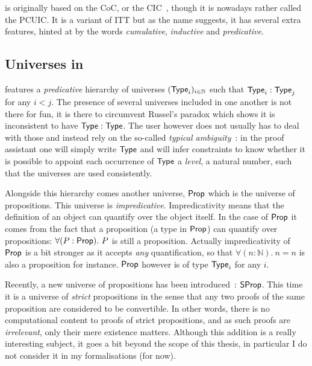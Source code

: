\Coq is originally based on the \acrfull{CoC}, or the
\acrfull{CIC}~, though it is nowadays rather
called the \acrfull{PCUIC}.
It is a variant of \acrshort{ITT} but as the name suggests, it has several
extra features, hinted at by the words \emph{cumulative}, \emph{inductive}
and \emph{predicative}.

\subsection{Universes in \Coq}

\Coq features a \emph{predicative} hierarchy of universes
\((\mathsf{Type}_i)_{i \in \mathbb{N}}\) such that \(\mathsf{Type}_i : \mathsf{Type}_j\) for any
\(i < j\). The presence of several universes included in one another is not
there for fun, it is there to circumvent Russel's paradox which
shows it is inconsistent to have \(\mathsf{Type} : \mathsf{Type}\).
The \Coq user however does not usually has to deal with those and
instead rely on the so-called
\emph{typical ambiguity}~:
in the \Coq proof assistant one will simply write \(\mathsf{Type}\) and \Coq will infer
constraints to know whether it is possible to appoint each occurrence of
\(\mathsf{Type}\) a \emph{level}, \ie a natural number, such that the universes are used
consistently.

Alongside this hierarchy comes another universe, \(\mathsf{Prop}\) which is the universe
of propositions. This universe is \emph{impredicative}.
Impredicativity means that the definition of an object can quantify over the
object itself. In the case of \(\mathsf{Prop}\) it comes from the fact that a
proposition (\ie a type in \(\mathsf{Prop}\)) can quantify over propositions: \eg
\(\forall (P : \mathsf{Prop}).\ P\) is still a proposition.
Actually impredicativity of \(\mathsf{Prop}\) is a bit stronger as it accepts \emph{any}
quantification, so that \(\forall (n : \mathbb{N}).\ n = n\) is also a
proposition for instance.
\(\mathsf{Prop}\) however is of type \(\mathsf{Type}_i\) for any \(i\).

Recently, a new universe of propositions has been
introduced~: \(\mathsf{SProp}\).
This time it is a universe of \emph{strict} propositions in the sense that any
two proofs of the same proposition are considered to be convertible.
In other words, there is no computational content to proofs of strict
propositions, and as such proofs are \emph{irrelevant}, only their mere
existence matters.
Although this addition is a really interesting subject, it goes a bit beyond
the scope of this thesis, in particular I do not consider it in my
formalisations (for now).

